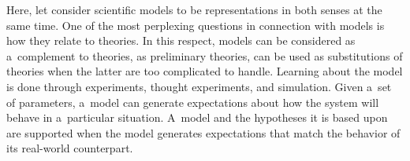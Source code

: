 \begin{multicols}{2}
  Here, let consider scientific models to be representations in both senses at the same
time. One of the most perplexing questions in connection with models is how they
relate to theories. In this respect, models can be considered as a~complement to
theories, as preliminary theories, can be used as substitutions of theories when the
latter are too complicated to handle. Learning about the model is done through
experiments, thought experiments, and simulation. Given a~set of parameters, a~model
can generate expectations about how the system will behave in a~particular situation.
A~model and the hypotheses it is based upon are supported when the model
generates expectations that match the behavior of its real-world counterpart.

\pagebreak

\end{multicols}

\begin{figure} %
\vspace*{1pt}
 \begin{center}
 \mbox{%
 \epsfxsize=155.928mm
 }
 \end{center}
 \vspace*{-9pt}
\label{f5-kl}
\end{figure}

